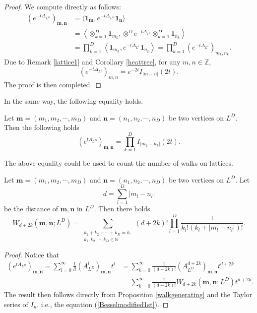 \documentclass{article}
\begin{document}
\begin{proof}
We compute directly as follows:
$$
\begin{aligned}
    \left(e^{-t\Delta_{L^D}}\right)_{\mathbf{m},\mathbf{n}}&=\langle \mathbf{1}_{\mathbf{m}}, e^{-t\Delta_{L^D}}\mathbf{1}_{\mathbf{n}} \rangle\\
    &=\left\langle \otimes_{k=1}^D\mathbf{1}_{m_k}, \otimes^D e^{-t\Delta_{L^1}} \otimes_{k=1}^D\mathbf{1}_{n_k}\right\rangle\\
    &=\prod_{k=1}^D \left\langle \mathbf{1}_{m_k}, e^{-t\Delta_{L^1}} \mathbf{1}_{n_k} \right\rangle=\prod_{k=1}^D \left(e^{-t\Delta_{L^1}}\right)_{m_k,n_k}.
\end{aligned}
$$
Due to Remark \ref{lattice1} and Corollary \ref{heattree}, for any $m,n\in \mathbb{Z}$,
$$\left(e^{-t\Delta_{L^1}}\right)_{m,n}=e^{-2t}I_{|m-n|}(2t).$$
The proof is then completed.
\end{proof}
In the same way, the following equality holds.
\begin{proposition}\label{walkgenerating}
    Let $\mathbf{m}=(m_1, m_2,\cdots,m_D)$ and $\mathbf{n}=(n_1, n_2,\cdots, n_D)$ be two vertices on $L^D$. Then the following holds
    \begin{equation}
        \left(e^{tA_{L^D}}\right)_{\mathbf{m}, \mathbf{n}}=\prod_{k=1}^{D}I_{|m_k-n_k|}(2t).
    \end{equation}
\end{proposition}

The above equality could be used to count the number of walks on lattices.

\begin{corollary}\label{numberofwalklattice}
    Let $\mathbf{m}=(m_1, m_2,\cdots,m_D)$ and $\mathbf{n}=(n_1, n_2,\cdots, n_D)$ be two vertices on $L^D$. Let $$d=\sum_{l=1}^D |m_l-n_l|$$ be the distance of $\mathbf{m}, \mathbf{n}$ in $L^D$. Then there holds
    $$W_{d+2k}(\mathbf{m},\mathbf{n};L^D)=\sum_{\substack{k_1+k_2+\cdots+k_D=k,\\ k_1, k_2, \cdots, k_D \in \mathbb{N}}}(d+2k)!\prod_{l=1}^{D}\frac{1}{k_l! (k_l+|m_l-n_l|)!}.$$ 
\end{corollary}

\begin{proof}
    Notice that 
    $$
    \begin{aligned}
        \left(e^{tA_{L^D}}\right)_{\mathbf{m}, \mathbf{n}}=\sum_{l=0}^{\infty}\frac{1}{l!}\left(A_{L^D}^l\right)_{\mathbf{m}, \mathbf{n}}t^l&=\sum_{k=0}^{\infty}\frac{1}{(d+2k)!}\left(A_{L^D}^{d+2k}\right)_{\mathbf{m}, \mathbf{n}}t^{d+2k}\\
        &=\sum_{k=0}^{\infty}\frac{1}{(d+2k)!}W_{d+2k}(\mathbf{m},\mathbf{n};L^D) t^{d+2k}.
    \end{aligned}
    $$
The result then follows directly from Proposition \ref{walkgenerating} and the Taylor series of  $I_n$, i.e., the equation (\ref{Besselmodified1st}).
\end{proof}
\end{document}
